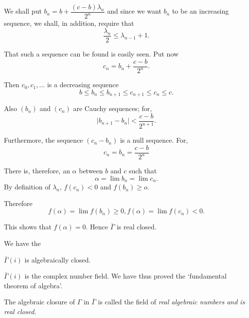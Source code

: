 We shall put $ b_n = b + \dfrac{( c -b ) \lambda_n}{2^n} $ and  since
we want  $b_n$ to be an increasing sequence, we shall, in addition,
require that  
$$
\frac{\lambda_n}{2}  \leq \lambda_{n-1} + 1 .
$$\pageoriginale

That such a sequence can be found is easily seen. Put now 
$$
c_n = b_n + \frac{c-b}{2^n} .
$$

Then $ c_0, c_1,\ldots $ is  a decreasing sequence 
$$
b \leq b_n \leq b_{n+1} \leq c_{n+1} \leq c_n \leq c. 
$$

Also $ (b_n) $ and $ (c_n) $ are Cauchy sequences; for,
$$
\mid b_{n+1} - b_n  \mid  < \frac{c-b}{2^{n+1}}.
$$

Furthermore, the sequence $ ( c_n -b_n ) $ is a null sequence. For,
$$
c_n = b_n =  \frac{c-b}{2^n}
$$

There is, therefore, an $ \alpha $ between $b$ and $c$ such that  
$$
\alpha = \lim b_n = \lim c_n .
$$
By definition of $ \lambda_n$, $f(c_n) < 0 $ and  $ f (b_n) \ge o $.

Therefore
$$
f (\alpha) = \lim f (b_n) \ge  0,  f (\alpha) = \lim f (c_n) < 0. 
$$

This shows that $ f (\alpha) = 0  $. Hence $ \bar{\Gamma} $ is real
closed.  

We have the 

 \begin{coro*}%
$\bar{\Gamma} ( i )$ is algebraically closed.
 \end{coro*} 

 $ \bar{\Gamma} ( i ) $ is the complex number field. We have thus
 proved the `fundamental theorem of algebra'. 
 
 The  algebraic closure of $ \Gamma $ in $ \bar{\Gamma} $ is called the
 field of \textit{real algebraic numbers  and  is real closed}. 

